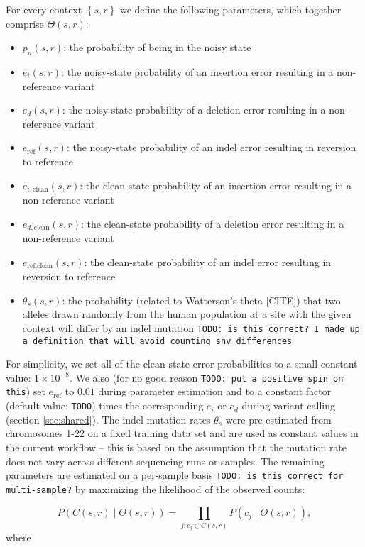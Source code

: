 \documentclass{article}
\begin{document}
For every context $\left\{ s,r \right\}$ we define the following parameters, which together comprise $\Theta(s,r)$:
\begin{itemize}
\item $p_n(s,r)$: the probability of being in the noisy state
\item $e_i(s,r)$: the noisy-state probability of an insertion error resulting in a non-reference variant
\item $e_d(s,r)$: the noisy-state probability of a deletion error resulting in a non-reference variant
\item $e_{\text{ref}}(s,r)$: the noisy-state probability of an indel error resulting in reversion to reference
\item $e_{i,\text{clean}}(s,r)$: the clean-state probability of an insertion error resulting in a non-reference variant
\item $e_{d,\text{clean}}(s,r)$: the clean-state probability of a deletion error resulting in a non-reference variant
\item $e_{\text{ref},\text{clean}}(s,r)$: the clean-state probability of an indel error resulting in reversion to reference
\item $\theta_s(s,r)$: the probability (related to Watterson's theta [CITE]) that two alleles drawn randomly from the human population at a site with the given context will differ by an indel mutation {\tt TODO: is this correct? I made up a definition that will avoid counting snv differences}
\end{itemize}
For simplicity, we set all of the clean-state error probabilities to a small constant value: $1 \times 10^{-8}$. We also (for no good reason {\tt TODO: put a positive spin on this}) set $e_{\text{ref}}$ to $0.01$ during parameter estimation and to a constant factor (default value: {\tt TODO}) times the corresponding $e_i$ or $e_d$ during variant calling (section \ref{sec:shared}). The indel mutation rates $\theta_s$ were pre-estimated from chromosomes 1-22 on a fixed training data set and are used as constant values in the current workflow -- this is based on the assumption that the mutation rate does not vary across different sequencing runs or samples. The remaining parameters are estimated on a per-sample basis {\tt TODO: is this correct for multi-sample?} by maximizing the likelihood of the observed counts:

\begin{equation*}
P(C(s,r) \mid \Theta(s,r))=\prod_{j: c_j\in C(s,r)}P(c_j \mid \Theta(s,r)),
\end{equation*}
where
\end{document}
